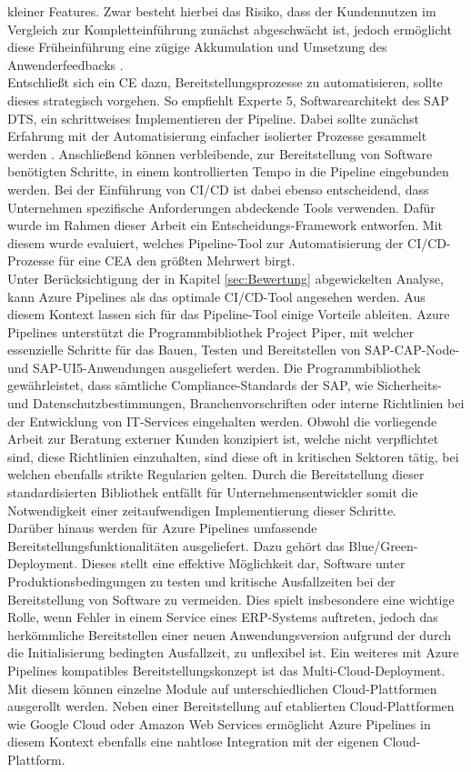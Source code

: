 kleiner Features. Zwar besteht hierbei das Risiko, dass der Kundennutzen im Vergleich zur Kompletteinführung zunächst abgeschwächt ist, jedoch ermöglicht diese Früheinführung eine zügige Akkumulation und Umsetzung des Anwenderfeedbacks \cite[9]{Halstenberg.2020}.\\ 
Entschließt sich ein CE dazu, Bereitstellungsprozesse zu automatisieren, sollte dieses strategisch vorgehen. So empfiehlt Experte 5, Softwarearchitekt des SAP DTS, ein schrittweises Implementieren der Pipeline. Dabei sollte zunächst Erfahrung mit der Automatisierung einfacher isolierter Prozesse gesammelt werden \cite[Z. 8 ff.]{SoftwareArchitektSAPDTSIntegration.}. Anschließend können verbleibende, zur Bereitstellung von Software benötigten Schritte, in einem kontrollierten Tempo in die Pipeline eingebunden werden. Bei der Einführung von CI/CD ist dabei ebenso entscheidend, dass Unternehmen spezifische Anforderungen abdeckende Tools verwenden. Dafür wurde im Rahmen dieser Arbeit ein Entscheidungs-Framework entworfen. Mit diesem wurde evaluiert, welches Pipeline-Tool zur Automatisierung der CI/CD-Prozesse für eine CEA den größten Mehrwert birgt.\\ Unter Berücksichtigung der in Kapitel \ref{sec:Bewertung} abgewickelten Analyse, kann Azure Pipelines als das optimale CI/CD-Tool angesehen werden. Aus diesem Kontext lassen sich für das Pipeline-Tool einige Vorteile ableiten. Azure Pipelines unterstützt die Programmbibliothek Project Piper, mit welcher essenzielle Schritte für das Bauen, Testen und Bereitstellen von SAP-CAP-Node- und SAP-UI5-Anwendungen ausgeliefert werden. Die Programmbibliothek gewährleistet, dass sämtliche Compliance-Standards der SAP, wie Sicherheits- und Datenschutzbestimmungen, Branchenvorschriften oder interne Richtlinien bei der Entwicklung von IT-Services eingehalten werden. Obwohl die vorliegende Arbeit zur Beratung externer Kunden konzipiert ist, welche nicht verpflichtet sind, diese Richtlinien einzuhalten, sind diese oft in kritischen Sektoren tätig, bei welchen ebenfalls strikte Regularien gelten. Durch die Bereitstellung dieser standardisierten Bibliothek entfällt für Unternehmensentwickler somit die Notwendigkeit einer zeitaufwendigen Implementierung dieser Schritte.\\ Darüber hinaus werden für Azure Pipelines umfassende Bereitstellungsfunktionalitäten ausgeliefert. Dazu gehört das Blue/Green-Deployment. Dieses stellt eine effektive Möglichkeit dar, Software unter Produktionsbedingungen zu testen und kritische Ausfallzeiten bei der Bereitstellung von Software zu vermeiden. Dies spielt insbesondere eine wichtige Rolle, wenn Fehler in einem Service eines ERP-Systems auftreten, jedoch das herkömmliche Bereitstellen einer neuen Anwendungsversion aufgrund der durch die Initialisierung  bedingten Ausfallzeit, zu unflexibel ist. Ein weiteres mit Azure Pipelines kompatibles Bereitstellungskonzept ist das Multi-Cloud-Deployment. Mit diesem können einzelne Module auf unterschiedlichen Cloud-Platt\-formen ausgerollt werden. Neben einer Bereitstellung auf etablierten Cloud-Platt\-formen wie Google Cloud oder Amazon Web Services ermöglicht Azure Pipelines in diesem Kontext ebenfalls eine nahtlose Integration mit der eigenen Cloud-Plattform.
